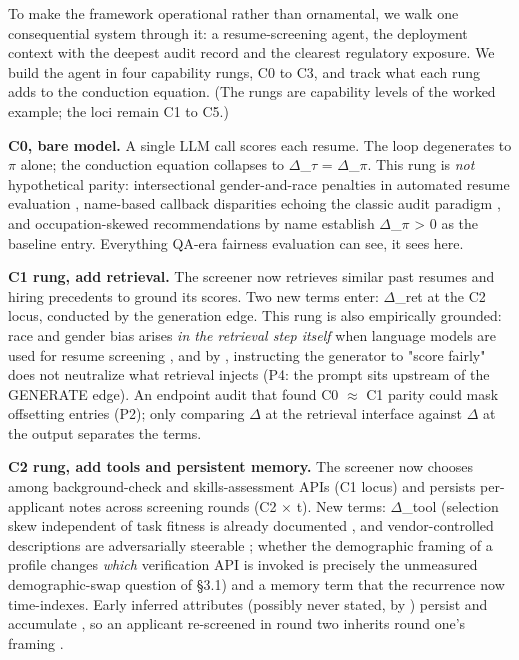 \documentclass[10pt]{article}
\begin{document}
To make the framework operational rather than ornamental, we walk one consequential system through it: a resume-screening agent, the deployment context with the deepest audit record \cite{raghavan2020mitigating,veldanda2023emily,an2025measuring,nghiem2024you,wilson2024gender} and the clearest regulatory exposure. We build the agent in four capability rungs, C0 to C3, and track what each rung adds to the conduction equation. (The rungs are capability levels of the worked example; the loci remain C1 to C5.)

\textbf{C0, bare model.} A single LLM call scores each resume. The loop degenerates to $\pi$ alone; the conduction equation collapses to $\Delta$\_$\tau$ = $\Delta$\_$\pi$. This rung is \emph{not} hypothetical parity: intersectional gender-and-race penalties in automated resume evaluation \cite{an2025measuring}, name-based callback disparities echoing the classic audit paradigm \cite{veldanda2023emily}, and occupation-skewed recommendations by name \cite{nghiem2024you} establish $\Delta$\_$\pi$ > 0 as the baseline entry. Everything QA-era fairness evaluation can see, it sees here.

\textbf{C1 rung, add retrieval.} The screener now retrieves similar past resumes and hiring precedents to ground its scores. Two new terms enter: $\Delta$\_ret at the C2 locus, conducted by the generation edge. This rung is also empirically grounded: race and gender bias arises \emph{in the retrieval step itself} when language models are used for resume screening \cite{wilson2024gender}, and by \cite{hu2024free}, instructing the generator to "score fairly" does not neutralize what retrieval injects (P4: the prompt sits upstream of the GENERATE edge). An endpoint audit that found C0 $\approx$ C1 parity could mask offsetting entries (P2); only comparing $\Delta$ at the retrieval interface against $\Delta$ at the output separates the terms.

\textbf{C2 rung, add tools and persistent memory.} The screener now chooses among background-check and skills-assessment APIs (C1 locus) and persists per-applicant notes across screening rounds (C2 $\times$ t). New terms: $\Delta$\_tool (selection skew independent of task fitness is already documented \cite{blankenstein2025biasbusters}, and vendor-controlled descriptions are adversarially steerable \cite{sneh2025tooltweak}; whether the demographic framing of a profile changes \emph{which} verification API is invoked is precisely the unmeasured demographic-swap question of \S{}3.1) and a memory term that the recurrence now time-indexes. Early inferred attributes (possibly never stated, by \cite{staab2023memorization}) persist and accumulate \cite{ma2026implicit}, so an applicant re-screened in round two inherits round one's framing \cite{simhi2026old}.
\end{document}
